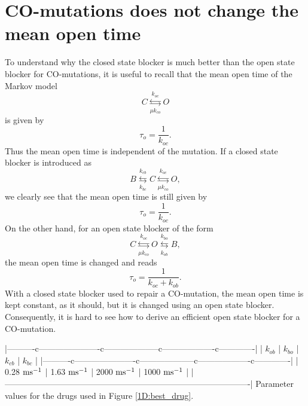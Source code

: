 \section{CO-mutations does not change the mean open time}
To understand why the closed state blocker is much better than the open state blocker for CO-mutations, it is useful to recall that the mean open time of the Markov model
\begin{equation}
C\underset{\mu k_{co}}{\overset{k_{oc}}{\leftrightarrows}}O \label{Markov111}
\end{equation}
is given by
\[ \tau_o=\frac{1}{k_{oc}}. \]
Thus the mean open time is independent of the mutation. If a closed state blocker is introduced as
\begin{equation}
B\underset{k_{bc}}{\overset{k_{cb}}{\leftrightarrows}}C\underset{\mu
k_{co}}{\overset{k_{oc}}{\leftrightarrows}}O, 
\end{equation}
we clearly see that the mean open time is still given by
\[ \tau_o=\frac{1}{k_{oc}}. \]
On the other hand, for an open state blocker of the form
\begin{equation}
C\underset{ \mu k_{co}}{\overset{k_{oc}}{\leftrightarrows}}O\underset{k_{ob}
}{\overset{k_{bo}}{\leftrightarrows}}B,
\end{equation}
the mean open time is changed and reads
\[ \tau_o=\frac{1}{k_{oc}+k_{ob}}. \]
With a closed state blocker used to repair a CO-mutation, the mean open time is kept constant, as it should, but it is changed using an open state blocker. Consequently, it is hard to see how to derive an efficient open state blocker for a CO-mutation.

|----------c----------------------c--------------------c-------------------c-------------|
| $k_{ob}$             | $k_{bo}$            | $k_{cb}$            | $k_{bc}$            |
|----------c----------------------c--------------------c-------------------c-------------|
|  0.28 $\rm{ms^{-1}}$ | 1.63 $\rm{ms^{-1}}$ | 2000 $\rm{ms^{-1}}$ | 1000 $\rm{ms^{-1}}$ |
|----------------------------------------------------------------------------------------|
Parameter values for the drugs used in Figure \ref{1D:best_drug}. %
\clearpage

